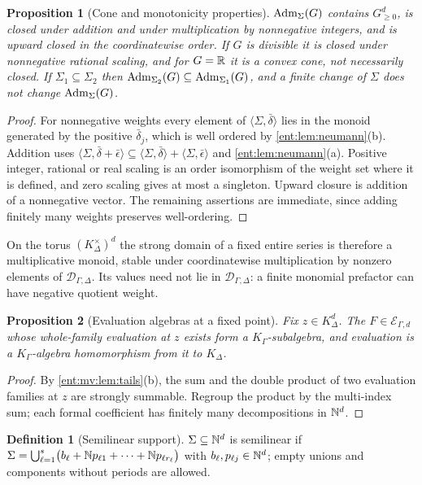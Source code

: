\documentclass[11pt]{article}
\theoremstyle{plain}
\theoremstyle{plain}
\newtheorem{proposition}[proposition]{Proposition}
\theoremstyle{plain}
\theoremstyle{definition}
\newtheorem{definition}[definition]{Definition}
\theoremstyle{definition}
\theoremstyle{definition}
\theoremstyle{definition}
\theoremstyle{remark}
\newcommand{\K}{K_\Gamma}\newcommand{\KD}{K_\Delta}
\newcommand{\Dom}{\mathcal D_{\Gamma,\Delta}}
\newcommand{\inner}[2]{\langle#1,#2\rangle}
\begin{document}
\begin{proposition}[Cone and monotonicity properties]\label{ent:mv:prop:cone}
$\operatorname{Adm}_\Sigma(G)$ contains $G_{\ge0}^d$, is closed under addition and under
multiplication by nonnegative integers, and is upward closed in the
coordinatewise order. If $G$ is divisible it is closed under nonnegative
rational scaling, and for $G=\mathbb R$ it is a convex cone, not necessarily closed.
If $\Sigma_1\subseteq\Sigma_2$ then $\operatorname{Adm}_{\Sigma_2}(G)\subseteq
\operatorname{Adm}_{\Sigma_1}(G)$, and a finite change of $\Sigma$ does not change
$\operatorname{Adm}_\Sigma(G)$.
\end{proposition}
\begin{proof}
For nonnegative weights every element of $\inner\Sigma{\bar\delta}$ lies in the
monoid generated by the positive $\bar\delta_j$, which is well ordered by
\cref{ent:lem:neumann}(b). Addition uses
$\inner\Sigma{\bar\delta+\bar\epsilon}\subseteq\inner\Sigma{\bar\delta}+
\inner\Sigma{\bar\epsilon}$ and \cref{ent:lem:neumann}(a). Positive integer,
rational or real scaling is an order isomorphism of the weight set where it
is defined, and zero scaling gives at most a singleton. Upward closure is
addition of a nonnegative vector. The remaining assertions are immediate,
since adding finitely many weights preserves well-ordering.
\end{proof}

On the torus $(\KD^\times)^d$ the strong domain of a fixed entire series is
therefore a multiplicative monoid, stable under coordinatewise
multiplication by nonzero elements of $\Dom$. Its values need not lie in
$\Dom$: a finite monomial prefactor can have negative quotient weight.

\begin{proposition}[Evaluation algebras at a fixed point]
\label{ent:mv:prop:algebra}
Fix $z\in\KD^d$. The $F\in\mathcal E_{\Gamma,d}$ whose whole-family evaluation
at $z$ exists form a $\K$-subalgebra, and evaluation is a $\K$-algebra
homomorphism from it to $\KD$.
\end{proposition}
\begin{proof}
By \cref{ent:mv:lem:tails}(b), the sum and the double product of two
evaluation families at $z$ are strongly summable. Regroup the product by the
multi-index sum; each formal coefficient has finitely many decompositions in
$\mathbb N^d$.
\end{proof}

\begin{definition}[Semilinear support]\label{ent:mv:def:semilinear}
$\Sigma\subseteq\mathbb N^d$ is semilinear if
$\Sigma=\bigcup_{\ell=1}^s\bigl(b_\ell+\mathbb N p_{\ell1}+\cdots+\mathbb N p_{\ell
r_\ell}\bigr)$ with $b_\ell,p_{\ell j}\in\mathbb N^d$; empty unions and components
without periods are allowed.
\end{definition}
\end{document}
